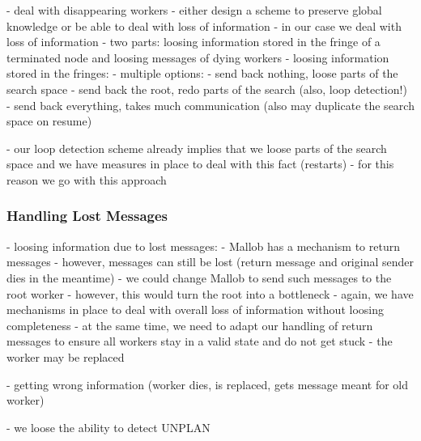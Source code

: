 - deal with disappearing workers
	- either design a scheme to preserve global knowledge or be able to deal with loss of information
	- in our case we deal with loss of information
	- two parts: loosing information stored in the fringe of a terminated node and loosing messages of dying workers
	- loosing information stored in the fringes:
		- multiple options:
			- send back nothing, loose parts of the search space
			- send back the root, redo parts of the search (also, loop detection!)
			- send back everything, takes much communication (also may duplicate the search space on resume)
			
			- our loop detection scheme already implies that we loose parts of the search space and we have measures in place to deal with this fact (restarts)
			- for this reason we go with this approach
			
\subsubsection{Handling Lost Messages}
	- loosing information due to lost messages:
		- Mallob has a mechanism to return messages
		- however, messages can still be lost (return message and original sender dies in the meantime)
		- we could change Mallob to send such messages to the root worker
		- however, this would turn the root into a bottleneck
		- again, we have mechanisms in place to deal with overall loss of information without loosing completeness
		- at the same time, we need to adapt our handling of return messages to ensure all workers stay in a valid state and do not get stuck
		- the worker may be replaced
		
	- getting wrong information (worker dies, is replaced, gets message meant for old worker)
	
	- we loose the ability to detect UNPLAN